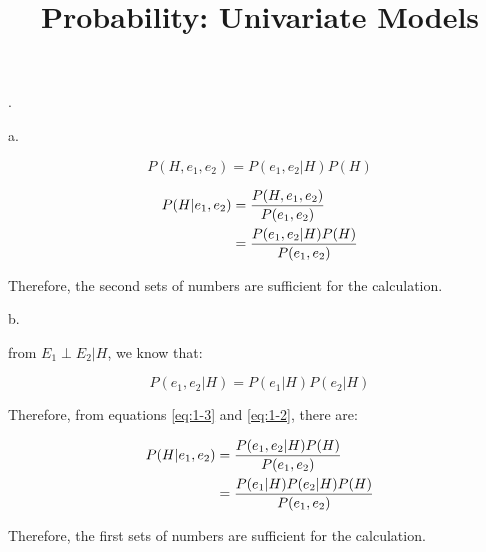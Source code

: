 \documentclass[UTF8]{article}
\title{Probability: Univariate Models}
\date{}
\begin{document}
\maketitle

.

\noindent a.

\begin{equation}
    P(H, e_1, e_2) = P(e_1, e_2 | H)P(H)\label{eq:1-1}
\end{equation}
 

\begin{align}
    P(H | e_1, e_2) &= \frac{P(H, e_1, e_2)}{P(e_1, e_2)}\notag\\
                    &= \frac{P(e_1, e_2 | H)P(H)}{P(e_1, e_2)}\label{eq:1-2}
\end{align}

Therefore, the second sets of numbers are sufficient for the calculation.

\noindent b.

from $E_1\perp E_2 | H$, we know that:

\begin{equation}
    P(e_1, e_2| H) = P(e_1|H)P(e_2|H)\label{eq:1-3}
\end{equation}

Therefore, from equations \ref{eq:1-3} and \ref{eq:1-2}, there are:

\begin{align}
    P(H | e_1, e_2) &= \frac{P(e_1, e_2 | H)P(H)}{P(e_1, e_2)}\notag\\
                    &= \frac{P(e_1|H)P(e_2|H)P(H)}{P(e_1, e_2)}
\end{align}

Therefore, the first sets of numbers are sufficient for the calculation.
\end{document}
